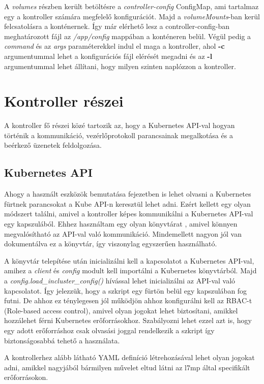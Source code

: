 A \textit{volumes} részben került betöltésre a \textit{controller-config} ConfigMap, ami 
tartalmaz egy a kontroller számára megfelelő konfigurációt. Majd a \textit{volumeMounts}-ban
kerül felcsatolásra a konténernek. Így már elérhető lesz a controller-config-ban meghatározott
fájl az \textit{/app/config} mappában a konténeren belül. Végül pedig a \textit{command} és az
\textit{args} paraméterekkel indul el maga a kontroller, ahol \textbf{-c} argumentummal 
lehet a konfigurációs fájl elérését megadni és az \textbf{-l} argumentummal lehet állítani,
hogy milyen szinten naplózzon a kontroller.

\section{Kontroller részei}

A kontroller fő részei közé tartozik az, hogy a Kubernetes API-val 
hogyan történik a kommunikáció, vezérlőprotokoll parancsainak megalkotása és
a beérkező üzenetek feldolgozása. 

\subsection{Kubernetes API}

Ahogy a használt eszközök bemutatása fejezetben is lehet olvasni a Kubernetes
fürtnek parancsokat a Kube API-n keresztül lehet adni. Ezért kellett egy olyan
módszert találni, amivel a kontroller képes kommunikálni a Kubernetes API-val 
egy kapszulából. Ehhez használtam egy olyan könyvtárat \cite{pythonKubeAPI}, amivel
könnyen megvalósítható az API-val való kommunikáció. Mindemellett nagyon jól
van dokumentálva ez a könyvtár, így viszonylag egyszerűen használható.

A könyvtár telepítése után inicializálni kell a kapcsolatot a Kubernetes 
API-val, amihez a \textit{client} és \textit{config} modult kell importálni
a Kubernetes könyvtárból. Majd a \textit{config.load\_incluster\_config()}
hívással lehet inicializálni az API-val való kapcsolatot. Így jelezzük, hogy a
szkript egy fürtön belül egy kapszulában fog futni. De ahhoz ez ténylegesen jól 
működjön ahhoz konfigurálni kell az RBAC-t (Role-based access control), amivel 
olyan jogokat lehet biztosítani, amikkel hozzálehet férni Kubernetes 
erőforrásokhoz. Szabályozni lehet ezzel azt is, hogy egy adott erőforráshoz 
csak olvasási joggal rendelkezik a szkript így biztonságosabbá tehető a használata.

A kontrollerhez alább látható YAML definíció létrehozásával lehet olyan jogokat
adni, amikkel nagyjából bármilyen művelet eltud látni az l7mp által specifikált 
erőforrásokon.

